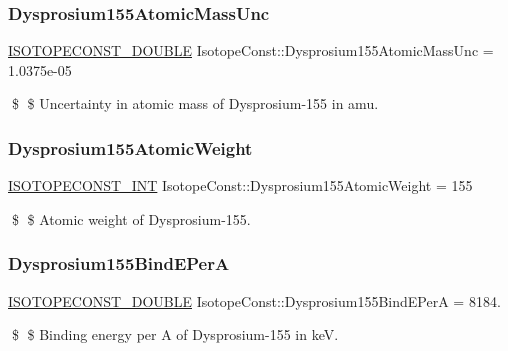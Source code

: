 \subsubsection{\texorpdfstring{Dysprosium155\+Atomic\+Mass\+Unc}{Dysprosium155AtomicMassUnc}}
{\footnotesize\ttfamily \mbox{\hyperlink{group___isotope_const-_macros_ga8f45a7272ce02c0b4c65c44636ed719a}{I\+S\+O\+T\+O\+P\+E\+C\+O\+N\+S\+T\+\_\+\+D\+O\+U\+B\+LE}} Isotope\+Const\+::\+Dysprosium155\+Atomic\+Mass\+Unc = 1.\+0375e-\/05}

\$ \$ Uncertainty in atomic mass of Dysprosium-\/155 in amu. \mbox{\label{group___isotope_const-_dysprosium-_dy155_ga67bbe67ae6629b99c85be98cca5d875c}} 
\subsubsection{\texorpdfstring{Dysprosium155\+Atomic\+Weight}{Dysprosium155AtomicWeight}}
{\footnotesize\ttfamily \mbox{\hyperlink{group___isotope_const-_macros_ga5f18360b3e99483a35c32d789e62621c}{I\+S\+O\+T\+O\+P\+E\+C\+O\+N\+S\+T\+\_\+\+I\+NT}} Isotope\+Const\+::\+Dysprosium155\+Atomic\+Weight = 155}

\$ \$ Atomic weight of Dysprosium-\/155. \mbox{\label{group___isotope_const-_dysprosium-_dy155_ga8502529cc84d95ebb2d3377faba161c2}} 
\subsubsection{\texorpdfstring{Dysprosium155\+Bind\+E\+PerA}{Dysprosium155BindEPerA}}
{\footnotesize\ttfamily \mbox{\hyperlink{group___isotope_const-_macros_ga8f45a7272ce02c0b4c65c44636ed719a}{I\+S\+O\+T\+O\+P\+E\+C\+O\+N\+S\+T\+\_\+\+D\+O\+U\+B\+LE}} Isotope\+Const\+::\+Dysprosium155\+Bind\+E\+PerA = 8184.}

\$ \$ Binding energy per A of Dysprosium-\/155 in keV. \mbox{\label{group___isotope_const-_dysprosium-_dy155_ga6a234a04587b232260a7ec8d1ec07f7d}} 
